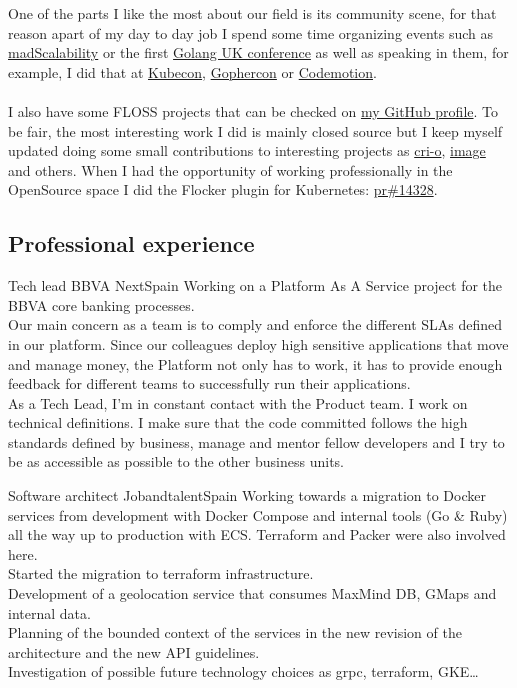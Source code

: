 \documentclass[11pt, a4paper, sans]{moderncv}
\begin{document}
\makecvtitle


%
%

One of the parts I like the most about our field is its community scene, for that reason apart of my day to day job
I spend some time organizing events such as \href{https://www.meetup.com/mad-scalability/}{madScalability} or
the first \href{https://golanguk.com/}{Golang UK conference} as well as speaking in them,
for example, I did that at \href{https://www.kubecon.io}{Kubecon}, \href{https://www.gophercon.co.uk/}{Gophercon} or \href{https://codemotionworld.com/}{Codemotion}.\\
\\
I also have some FLOSS projects that can be checked on \href{https://github.com/agonzalezro}{my GitHub profile}.
To be fair, the most interesting work I did is mainly closed source but I keep myself updated doing some small contributions to interesting projects as \href{https://github.com/agonzalezro/cri-o}{cri-o}, \href{https://github.com/containers/image}{image} and others.
When I had the opportunity of working professionally in the OpenSource space I did the Flocker plugin for Kubernetes: \href{https://github.com/kubernetes/kubernetes/pull/14328}{pr\#14328}.\\

\subsection{Professional experience}
{Tech lead}
{BBVA Next}{Spain}{}
{Working on a Platform As A Service project for the BBVA core banking processes.\\
Our main concern as a team is to comply and enforce the different SLAs defined in our platform. Since our colleagues deploy high sensitive applications that move and manage money, the Platform not only has to work, it has to provide enough feedback for different teams to successfully run their applications.\\
As a Tech Lead, I’m in constant contact with the Product team. I work on technical definitions. I make sure that the code committed follows the high standards defined by business, manage and mentor fellow developers and I try to be as accessible as possible to the other business units.\\}

{Software architect}
{Jobandtalent}{Spain}{}
{Working towards a migration to Docker services from development with
  Docker Compose and internal tools (Go \& Ruby) all the way up to
  production with ECS. Terraform and Packer were also involved here.\\
  Started the migration to terraform infrastructure.\\
Development of a geolocation service that consumes MaxMind DB, GMaps and
internal data.\\
Planning of the bounded context of the services in the new revision of the
architecture and the new API guidelines.\\
Investigation of possible future technology choices as grpc, terraform, GKE\ldots\\}
\end{document}

